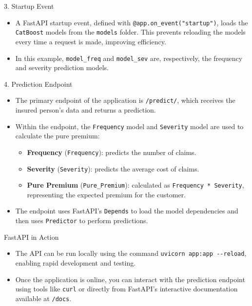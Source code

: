 \documentclass[
  ignorenonframetext,
]{beamer}
\providecommand{\tightlist}{%
  \setlength{\itemsep}{0pt}\setlength{\parskip}{0pt}}
\begin{document}
\begin{frame}[fragile]
\begin{block}{3. Startup Event}
\label{startup-event}
\begin{itemize}
\tightlist
\item
  A FastAPI startup event, defined with
  \texttt{@app.on\_event("startup")}, loads the \texttt{CatBoost} models
  from the \texttt{models} folder. This prevents reloading the models
  every time a request is made, improving efficiency.
\item
  In this example, \texttt{model\_freq} and \texttt{model\_sev} are,
  respectively, the frequency and severity prediction models.
\end{itemize}
\end{block}
\end{frame}

\begin{frame}[fragile]
\begin{block}{4. Prediction Endpoint}
\label{prediction-endpoint}
\begin{itemize}
\tightlist
\item
  The primary endpoint of the application is \texttt{/predict/}, which
  receives the insured person's data and returns a prediction.
\item
  Within the endpoint, the \texttt{Frequency} model and
  \texttt{Severity} model are used to calculate the pure premium:

  \begin{itemize}
  \tightlist
  \item
    \textbf{Frequency} (\texttt{Frequency}): predicts the number of
    claims.
  \item
    \textbf{Severity} (\texttt{Severity}): predicts the average cost of
    claims.
  \item
    \textbf{Pure Premium} (\texttt{Pure\_Premium}): calculated as
    \texttt{Frequency\ *\ Severity}, representing the expected premium
    for the customer.
  \end{itemize}
\item
  The endpoint uses FastAPI's \texttt{Depends} to load the model
  dependencies and then uses \texttt{Predictor} to perform predictions.
\end{itemize}
\end{block}
\end{frame}

\begin{frame}[fragile]
\begin{block}{FastAPI in Action}
\label{fastapi-in-action}
\begin{itemize}
\tightlist
\item
  The API can be run locally using the command
  \texttt{uvicorn\ app:app\ -\/-reload}, enabling rapid development and
  testing.
\item
  Once the application is online, you can interact with the prediction
  endpoint using tools like \texttt{curl} or directly from FastAPI's
  interactive documentation available at \texttt{/docs}.
\end{itemize}
\end{block}
\end{frame}
\end{document}
